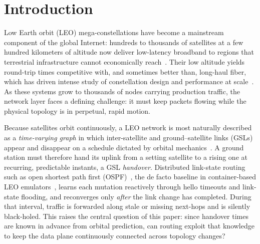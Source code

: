 
\section{Introduction}
\label{sec:intro}

Low Earth orbit (LEO) mega-constellations have become a mainstream component of
the global Internet: hundreds to thousands of satellites at a few hundred
kilometers of altitude now deliver low-latency broadband to regions that
terrestrial infrastructure cannot economically reach~\cite{smallsats2020,
handley:ground-relays:2019}.
Their low altitude yields round-trip times competitive with, and sometimes
better than, long-haul fiber, which has driven intense study of constellation
design and performance at scale~\cite{kassing2020exploring,lai2020starperf}.
As these systems grow to thousands of nodes carrying production traffic, the
network layer faces a defining challenge: it must keep packets flowing while the
physical topology is in perpetual, rapid motion.

Because satellites orbit continuously, a LEO network is most naturally described
as a \emph{time-varying graph} in which inter-satellite and ground--satellite
links (GSLs) appear and disappear on a schedule dictated by orbital
mechanics~\cite{seong:topological-design:1995,kassing2020exploring}.
A ground station must therefore hand its uplink from a setting satellite to a
rising one at recurring, predictable instants, a GSL \emph{handover}.
Distributed link-state routing such as open shortest path first
(OSPF)~\cite{sidhu:ospf:1993}, the de facto baseline in container-based LEO
emulators~\cite{lai2023starrynet}, learns each mutation reactively through
hello timeouts and link-state flooding, and reconverges only \emph{after} the
link change has completed.
During that interval, traffic is forwarded along stale or missing next-hops and
is silently black-holed.
This raises the central question of this paper: since handover times are known
in advance from orbital prediction, can routing exploit that knowledge to keep
the data plane continuously connected across topology changes?

